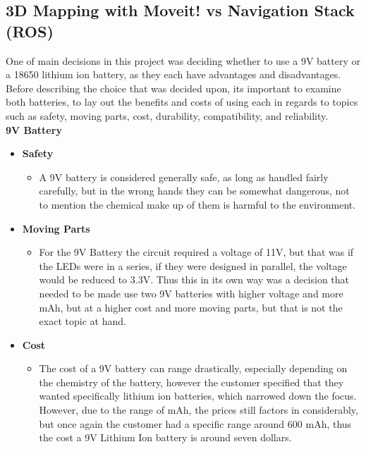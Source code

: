 \documentclass[12pt]{article}
\begin{document}
				\subsection{3D Mapping with Moveit! vs Navigation Stack (ROS)}
				One of main decisions in this project was deciding whether to use a 9V battery or a 18650 lithium ion battery, as they each have advantages and disadvantages. Before describing the choice that was decided upon, its important to examine both batteries, to lay out the benefits and costs of using each in regards to topics such as safety, moving parts, cost, durability, compatibility, and reliability.\\
					
					\noindent\textbf{9V Battery}
					{\renewcommand\labelitemi{}
						\begin{itemize}
							\item \textbf{Safety}
							\begin{itemize}
								\item A 9V battery is considered generally safe, as long as handled fairly carefully, but in the wrong hands they can be somewhat dangerous, not to mention the chemical make up of them is harmful to the environment.
							\end{itemize}
							\item \textbf{Moving Parts}
							\begin{itemize}
								\item For the 9V Battery the circuit required a voltage of 11V, but that was if the LEDs were in a series, if they were designed in parallel, the voltage would be reduced to 3.3V. Thus this in its own way was a decision that needed to be made use two 9V batteries with higher voltage and more mAh, but at a higher cost and more moving parts, but that is not the exact topic at hand.
							\end{itemize}
							\item \textbf{Cost}
							\begin{itemize}
								\item The cost of a 9V battery can range drastically, especially depending on the chemistry of the battery, however the customer specified that they wanted specifically lithium ion batteries, which narrowed down the focus. However, due to the range of mAh, the prices still factors in considerably, but once again the customer had a specific range around 600 mAh, thus the cost a 9V Lithium Ion battery is around seven dollars.
							\end{itemize}

\end{itemize}}
\end{document}
